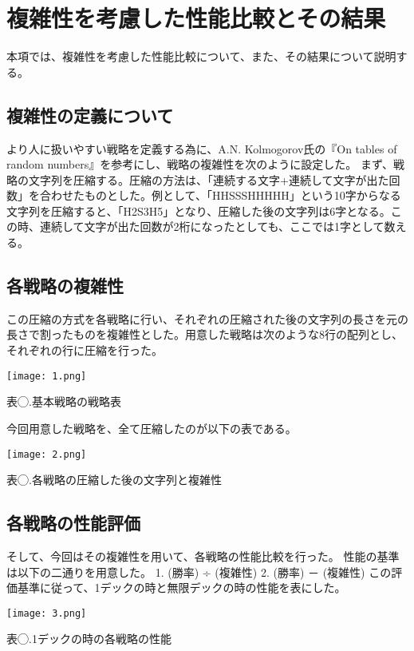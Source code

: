 \documentclass{jsarticle}
\begin{document}
 \section{複雑性を考慮した性能比較とその結果}

本項では、複雑性を考慮した性能比較について、また、その結果について説明する。



\subsection{複雑性の定義について}

より人に扱いやすい戦略を定義する為に、A.N. Kolmogorov氏の『On tables of random numbers』を参考にし、戦略の複雑性を次のように設定した。
まず、戦略の文字列を圧縮する。圧縮の方法は、「連続する文字+連続して文字が出た回数」を合わせたものとした。例として、「HHSSSHHHHH」という10字からなる文字列を圧縮すると、「H2S3H5」となり、圧縮した後の文字列は6字となる。この時、連続して文字が出た回数が2桁になったとしても、ここでは1字として数える。



\subsection{各戦略の複雑性}

この圧縮の方式を各戦略に行い、それぞれの圧縮された後の文字列の長さを元の長さで割ったものを複雑性とした。用意した戦略は次のような8行の配列とし、それぞれの行に圧縮を行った。

\texttt{[image: 1.png]}

表◯.基本戦略の戦略表


今回用意した戦略を、全て圧縮したのが以下の表である。

\texttt{[image: 2.png]}

表◯.各戦略の圧縮した後の文字列と複雑性


\subsection{各戦略の性能評価}

そして、今回はその複雑性を用いて、各戦略の性能比較を行った。
性能の基準は以下の二通りを用意した。
1. (勝率) ÷ (複雑性)
2. (勝率) － (複雑性)
この評価基準に従って、1デックの時と無限デックの時の性能を表にした。


\texttt{[image: 3.png]}

表◯.1デックの時の各戦略の性能
\end{document}
